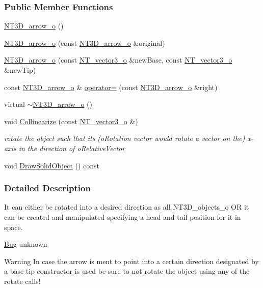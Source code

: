 \subsubsection*{Public Member Functions}
\begin{DoxyCompactItemize}
\item 
\hyperlink{class_n_t3_d__arrow__o_a8d0f94b7fa94e2776082bfde9892abe5}{NT3D\_\-arrow\_\-o} ()
\item 
\hyperlink{class_n_t3_d__arrow__o_ac4a6f51366fee0e917ca8166d019d47c}{NT3D\_\-arrow\_\-o} (const \hyperlink{class_n_t3_d__arrow__o}{NT3D\_\-arrow\_\-o} \&original)
\item 
\hyperlink{class_n_t3_d__arrow__o_a7e273eca61c876c804fc022c7cbb8fc7}{NT3D\_\-arrow\_\-o} (const \hyperlink{class_n_t__vector3__o}{NT\_\-vector3\_\-o} \&newBase, const \hyperlink{class_n_t__vector3__o}{NT\_\-vector3\_\-o} \&newTip)
\item 
const \hyperlink{class_n_t3_d__arrow__o}{NT3D\_\-arrow\_\-o} \& \hyperlink{class_n_t3_d__arrow__o_a751177756838ab996618bd038f8c6ba2}{operator=} (const \hyperlink{class_n_t3_d__arrow__o}{NT3D\_\-arrow\_\-o} \&right)
\item 
virtual \hyperlink{class_n_t3_d__arrow__o_a47f302a4cf39bc46e5d02c006526aa33}{$\sim$NT3D\_\-arrow\_\-o} ()
\item 
void \hyperlink{class_n_t3_d__arrow__o_a1ef1eea4ed6b484bb978df5339e6bfde}{Collinearize} (const \hyperlink{class_n_t__vector3__o}{NT\_\-vector3\_\-o} \&)
\begin{DoxyCompactList}\small\item\em rotate the object such that its (oRotation vector would rotate a vector on the) x-\/axis in the direction of oRelativeVector \item\end{DoxyCompactList}\item 
void \hyperlink{class_n_t3_d__arrow__o_a6e6199892b2098aa11467149074a3355}{DrawSolidObject} () const 
\end{DoxyCompactItemize}


\subsubsection{Detailed Description}
It can either be rotated into a desired direction as all NT3D\_\-objects\_\-o OR it can be created and manipulated specifying a head and tail position for it in space. \begin{Desc}
\item[\hyperlink{bug__bug000005}{Bug}]unknown \end{Desc}
\begin{DoxyWarning}{Warning}
In case the arrow is ment to point into a certain direction designated by a base-\/tip constructor is used be sure to not rotate the object using any of the rotate calls! 
\end{DoxyWarning}


